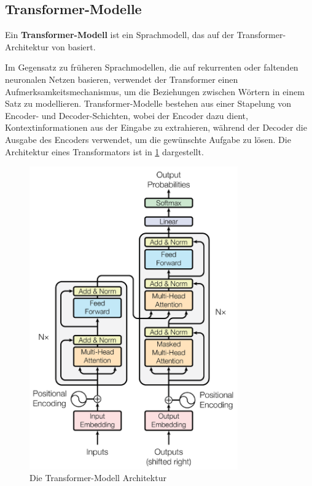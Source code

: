 \subsection{Transformer-Modelle}\label{sec:grundlagen:transformer}

\begin{definition}\label{def:transformer-modell}
    Ein \textbf{Transformer-Modell} ist ein Sprachmodell, das auf der Transformer-Architektur von \citet{attention} basiert.
\end{definition}
Im Gegensatz zu früheren Sprachmodellen, die auf rekurrenten oder faltenden neuronalen Netzen basieren, verwendet der Transformer einen Aufmerksamkeitsmechanismus, um die Beziehungen zwischen Wörtern in einem Satz zu modellieren.
Transformer-Modelle bestehen aus einer Stapelung von Encoder- und Decoder-Schichten, wobei der Encoder dazu dient, Kontextinformationen aus der Eingabe zu extrahieren,
während der Decoder die Ausgabe des Encoders verwendet, um die gewünschte Aufgabe zu lösen.
Die Architektur eines Transformators ist in \cref{bild:transformer} dargestellt.\\

\begin{figure}[ht]
    \centering
    \includegraphics[width=0.8\textwidth]{zeichnungen/transformer.png}
    \caption{Die Transformer-Modell Architektur \citep{attention}}
    \label{bild:transformer}
\end{figure}

